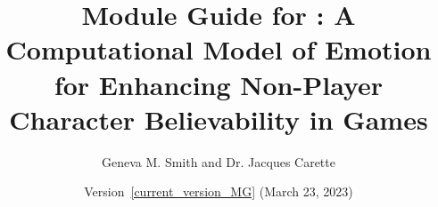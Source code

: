 \documentclass[11pt, titlepage]{article}
\begin{document}
    \setcounter{pagesMG}{\totalpages}

    \begin{titlepage}
        \thispagestyle{empty}

        \title{Module Guide for \progname{}: A Computational Model of Emotion
        for
        Enhancing Non-Player Character Believability in Games}
        \author{Geneva M. Smith and Dr. Jacques Carette}
        \date{Version~\ref{current_version_MG} (March 23, 2023)}

        \maketitle
    \end{titlepage}

    \pagestyle{fancy}

    \vspace*{\fill}
\end{document}
